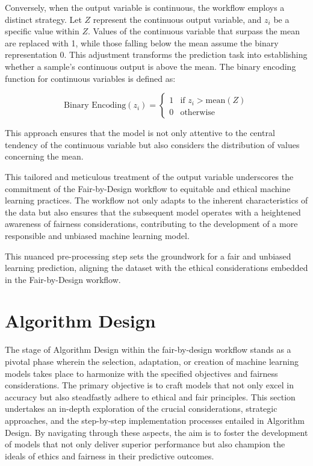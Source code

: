 \documentclass[12pt,a4paper,openright,twoside]{book}
\begin{document}
\begin{enumerate}
    Conversely, when the output variable is continuous, the workflow employs a distinct strategy. Let $Z$ represent the continuous output variable, and $z_i$ be a specific value within $Z$. Values of the continuous variable that surpass the mean are replaced with 1, while those falling below the mean assume the binary representation 0. This adjustment transforms the prediction task into establishing whether a sample's continuous output is above the mean. The binary encoding function for continuous variables is defined as:

    \[
    \text{Binary Encoding}(z_i) = \begin{cases} 
    1 & \text{if } z_i > \text{mean}(Z) \\ 
    0 & \text{otherwise}
    \end{cases}
    \]

    This approach ensures that the model is not only attentive to the central tendency of the continuous variable but also considers the distribution of values concerning the mean.

    This tailored and meticulous treatment of the output variable underscores the commitment of the Fair-by-Design workflow to equitable and ethical machine learning practices. The workflow not only adapts to the inherent characteristics of the data but also ensures that the subsequent model operates with a heightened awareness of fairness considerations, contributing to the development of a more responsible and unbiased machine learning model.

\end{enumerate}

This nuanced pre-processing step sets the groundwork for a fair and unbiased learning prediction, aligning the dataset with the ethical considerations embedded in the Fair-by-Design workflow.

\section{Algorithm Design}
\label{section: algorithm-design}

The stage of Algorithm Design within the fair-by-design workflow stands as a pivotal phase wherein the selection, adaptation, or creation of machine learning models takes place to harmonize with the specified objectives and fairness considerations. The primary objective is to craft models that not only excel in accuracy but also steadfastly adhere to ethical and fair principles. This section undertakes an in-depth exploration of the crucial considerations, strategic approaches, and the step-by-step implementation processes entailed in Algorithm Design. By navigating through these aspects, the aim is to foster the development of models that not only deliver superior performance but also champion the ideals of ethics and fairness in their predictive outcomes.
\end{document}
